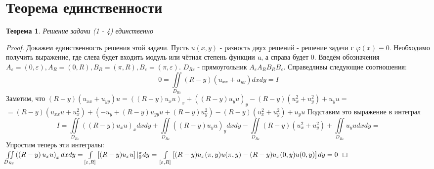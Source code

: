 \documentclass[a4paper, 11pt]{article}
\newtheorem{theorem}{Теорема}
\begin{document}
	\section{Теорема единственности}
	\begin{theorem}
		Решение задачи (1 - 4) единственно
	\end{theorem}
	\begin{proof}
		Докажем единственность решения этой задачи. Пусть $u(x,y)$ - разность двух решений - решение задачи с $\varphi(x) \equiv 0$. Необходимо получить выражение, где слева будет входить модуль или чётная степень функции u, а справа будет 0.\newline
		Введём обозначения $A_\varepsilon = (0, \varepsilon), A_R = (0, R), B_R = (\pi, R), B_\varepsilon = (\pi, \varepsilon)$. $D_{R\varepsilon}$ - прямоугольник $A_\varepsilon A_R B_R B_\varepsilon$. Справедливы следующие соотношения:
		\begin{equation*}
			0 = \iint\limits_{D_{R\varepsilon}} (R-y) (u_{xx} + u_{yy}) dx dy = I
		\end{equation*}
		Заметим, что 
		\begin{math}
			(R - y) (u_{xx} + u_{yy}) u = \left( \left(R - y\right) u_x u\right)_x  + \left( \left(R - y\right) u_y u\right)_y - \left(R- y\right) \left(u_x^2 + u_y^2\right) +  u_y u = 
		\end{math}
		\begin{math}
			= \left(R-y\right) \left(u_{xx} u + u_x^2\right) + \left(-u_y + \left(R-y\right) u_{yy} u + \left(R-y\right)u_y^2\right) - \left(R- y\right) \left(u_x^2 + u_y^2\right)+  u_y u
		\end{math}
		\newline Подставим это выражение в интеграл
		\begin{equation*}
			I	=	\iint\limits_{D_{R\varepsilon}} \left( \left(R - y\right) u_x u\right)_x dx dy  + \iint\limits_{D_{R\varepsilon}} \left( \left(R - y\right) u_y u\right)_y dx dy  
			- \iint\limits_{D_{R\varepsilon}} \left(R- y\right) \left(u_x^2 + u_y^2\right) + \iint\limits_{D_{R\varepsilon}} u_y u dx dy = 
		\end{equation*}
		Упростим теперь эти интегралы:\newline
		\begin{math}
			\iint\limits_{D_{R\varepsilon}} \left( \left(R - y\right) u_x u\right)_x dx dy = \int\limits_{[\varepsilon, R]} \left[(R-y)u_xu\right] \vert_0^\pi dy = \\ \int\limits_{[\varepsilon, R]} \left[(R-y) u_x(\pi, y)u(\pi,y) - (R-y) u_x(0, y)u(0,y)\right]dy = 0

\end{math}
\end{proof}
\end{document}
